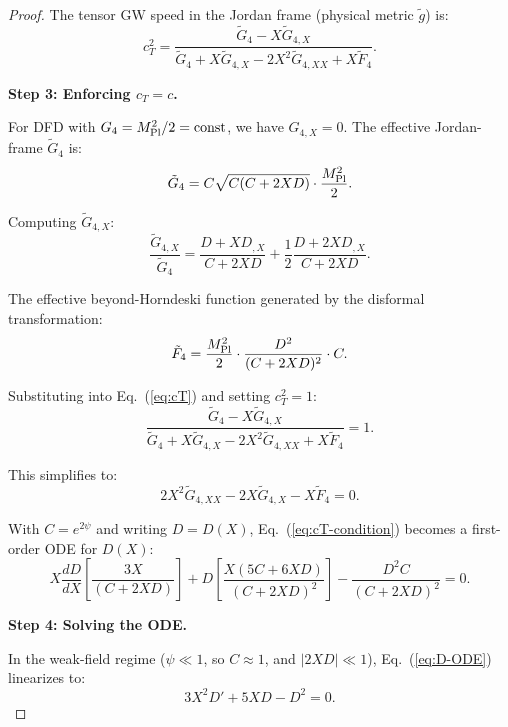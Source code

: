 \documentclass[11pt,a4paper]{article}
\begin{document}
\begin{proof}
The tensor GW speed in the Jordan frame (physical metric $\tilde{g}$) is:
\begin{equation}\label{eq:cT}
c_T^2 = \frac{\tilde{G}_4 - X\tilde{G}_{4,X}}{\tilde{G}_4 + X\tilde{G}_{4,X} - 2X^2\tilde{G}_{4,XX} + X\tilde{F}_4}.
\end{equation}

\textbf{Step 3: Enforcing $c_T = c$.}

For DFD with $G_4 = M_{\rm Pl}^2/2 = \text{const}$, we have $G_{4,X} = 0$. The effective Jordan-frame $\tilde{G}_4$ is:
\begin{equation}
\tilde{G}_4 = C\sqrt{C(C+2XD)}\cdot\frac{M_{\rm Pl}^2}{2}.
\end{equation}

Computing $\tilde{G}_{4,X}$:
\begin{equation}
\frac{\tilde{G}_{4,X}}{\tilde{G}_4} = \frac{D + XD_{,X}}{C + 2XD} + \frac{1}{2}\frac{D + 2XD_{,X}}{C + 2XD}.
\end{equation}

The effective beyond-Horndeski function generated by the disformal transformation:
\begin{equation}
\tilde{F}_4 = \frac{M_{\rm Pl}^2}{2}\cdot\frac{D^2}{(C+2XD)^2}\cdot C.
\end{equation}

Substituting into Eq.~(\ref{eq:cT}) and setting $c_T^2 = 1$:
\begin{equation}
\frac{\tilde{G}_4 - X\tilde{G}_{4,X}}{\tilde{G}_4 + X\tilde{G}_{4,X} - 2X^2\tilde{G}_{4,XX} + X\tilde{F}_4} = 1.
\end{equation}

This simplifies to:
\begin{equation}\label{eq:cT-condition}
2X^2\tilde{G}_{4,XX} - 2X\tilde{G}_{4,X} - X\tilde{F}_4 = 0.
\end{equation}

With $C = e^{2\psi}$ and writing $D = D(X)$, Eq.~(\ref{eq:cT-condition}) becomes a first-order ODE for $D(X)$:
\begin{equation}\label{eq:D-ODE}
X\frac{dD}{dX}\left[\frac{3X}{(C+2XD)}\right] + D\left[\frac{X(5C + 6XD)}{(C+2XD)^2}\right] - \frac{D^2 C}{(C+2XD)^2} = 0.
\end{equation}

\textbf{Step 4: Solving the ODE.}

In the weak-field regime ($\psi \ll 1$, so $C \approx 1$, and $|2XD| \ll 1$), Eq.~(\ref{eq:D-ODE}) linearizes to:
\begin{equation}
3X^2 D' + 5XD - D^2 = 0.
\end{equation}


\end{proof}
\end{document}
